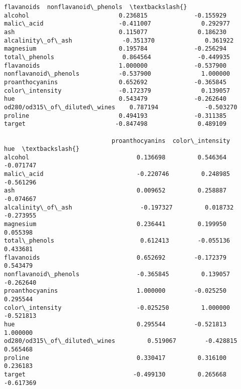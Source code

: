 \documentclass[11pt]{article}
\begin{document}
\begin{tcolorbox}[breakable, size=fbox, boxrule=.5pt, pad at break*=1mm, opacityfill=0]
\begin{Verbatim}[commandchars=\\\{\}]
                              flavanoids  nonflavanoid\_phenols  \textbackslash{}
alcohol                         0.236815             -0.155929
malic\_acid                     -0.411007              0.292977
ash                             0.115077              0.186230
alcalinity\_of\_ash              -0.351370              0.361922
magnesium                       0.195784             -0.256294
total\_phenols                   0.864564             -0.449935
flavanoids                      1.000000             -0.537900
nonflavanoid\_phenols           -0.537900              1.000000
proanthocyanins                 0.652692             -0.365845
color\_intensity                -0.172379              0.139057
hue                             0.543479             -0.262640
od280/od315\_of\_diluted\_wines    0.787194             -0.503270
proline                         0.494193             -0.311385
target                         -0.847498              0.489109

                              proanthocyanins  color\_intensity       hue  \textbackslash{}
alcohol                              0.136698         0.546364 -0.071747
malic\_acid                          -0.220746         0.248985 -0.561296
ash                                  0.009652         0.258887 -0.074667
alcalinity\_of\_ash                   -0.197327         0.018732 -0.273955
magnesium                            0.236441         0.199950  0.055398
total\_phenols                        0.612413        -0.055136  0.433681
flavanoids                           0.652692        -0.172379  0.543479
nonflavanoid\_phenols                -0.365845         0.139057 -0.262640
proanthocyanins                      1.000000        -0.025250  0.295544
color\_intensity                     -0.025250         1.000000 -0.521813
hue                                  0.295544        -0.521813  1.000000
od280/od315\_of\_diluted\_wines         0.519067        -0.428815  0.565468
proline                              0.330417         0.316100  0.236183
target                              -0.499130         0.265668 -0.617369


\end{Verbatim}
\end{tcolorbox}
\end{document}
